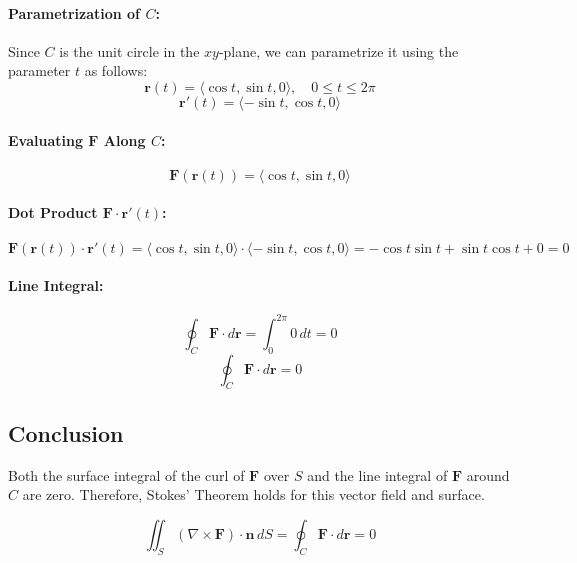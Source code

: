 \documentclass[11pt]{article}
\begin{document}
\paragraph{Parametrization of \( C \):}
Since \( C \) is the unit circle in the \( xy \)-plane, we can parametrize it using the parameter \( t \) as follows:
\[
\mathbf{r}(t) = \langle \cos t, \sin t, 0 \rangle, \quad 0 \leq t \leq 2\pi
\]
\[
\mathbf{r}'(t) = \langle -\sin t, \cos t, 0 \rangle
\]

\paragraph{Evaluating \( \mathbf{F} \) Along \( C \):}
\[
\mathbf{F}(\mathbf{r}(t)) = \langle \cos t, \sin t, 0 \rangle
\]

\paragraph{Dot Product \( \mathbf{F} \cdot \mathbf{r}'(t) \):}
\[
\mathbf{F}(\mathbf{r}(t)) \cdot \mathbf{r}'(t) = \langle \cos t, \sin t, 0 \rangle \cdot \langle -\sin t, \cos t, 0 \rangle = -\cos t \sin t + \sin t \cos t + 0 = 0
\]

\paragraph{Line Integral:}
\[
\oint_{C} \mathbf{F} \cdot d\mathbf{r} = \int_{0}^{2\pi} 0 \, dt = 0
\]
\[
\boxed{ \oint_{C} \mathbf{F} \cdot d\mathbf{r} = 0 }
\]

\newpage

\subsection{Conclusion}

Both the surface integral of the curl of \( \mathbf{F} \) over \( S \) and the line integral of \( \mathbf{F} \) around \( C \) are zero. Therefore, Stokes' Theorem holds for this vector field and surface.

\[
\boxed{ \iint_{S} (\nabla \times \mathbf{F}) \cdot \mathbf{n} \, dS = \oint_{C} \mathbf{F} \cdot d\mathbf{r} = 0 }
\]
\end{document}
